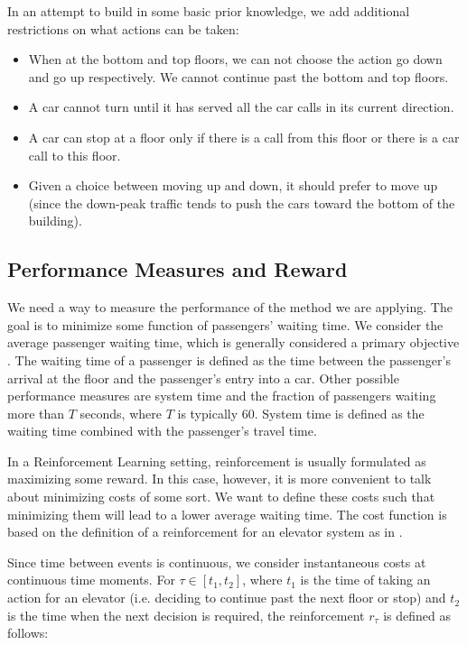 In an attempt to build in some basic prior knowledge, we add additional restrictions on what actions can be taken:

\begin{itemize}
    \item When at the bottom and top floors, we can not choose the action go down and go up respectively. We cannot continue past the bottom and top floors.
    \item A car cannot turn until it has served all the car calls in its current direction.
    \item A car can stop at a floor only if there is a call from this floor or there
    is a car call to this floor.
    \item Given a choice between moving up and down, it should prefer to move up (since
    the down-peak traffic tends to push the cars toward the bottom of the building).
\end{itemize}

\subsection{Performance Measures and Reward}

We need a way to measure the performance of the method we are applying. The goal is to minimize some function of passengers' waiting time. We consider the average passenger waiting time, which is generally considered a primary objective \cite{elevator_dynamics}. The waiting time of a passenger is defined as the time between the passenger's arrival at the floor and the passenger's entry into a car. Other possible performance measures are system time and the fraction of passengers waiting more than $T$ seconds, where $T$ is typically 60. System time is defined as the waiting time combined with the passenger's travel time.

In a Reinforcement Learning setting, reinforcement is usually formulated as maximizing some reward. In this case, however, it is more convenient to talk about minimizing costs of some sort. We want to define these costs such that minimizing them will lead to a lower average waiting time. The cost function is based on the definition of a reinforcement for an elevator system as in \cite{crites_barto_group_1998, crites_barto_1998}.

Since time between events is continuous, we consider instantaneous costs at continuous time moments. For $\tau \in [t_1, t_2]$, where $t_1$ is the time of taking an action for an elevator (i.e. deciding to continue past the next floor or stop) and $t_2$ is the time when the next decision is required, the reinforcement $r_\tau$ is defined as follows:


